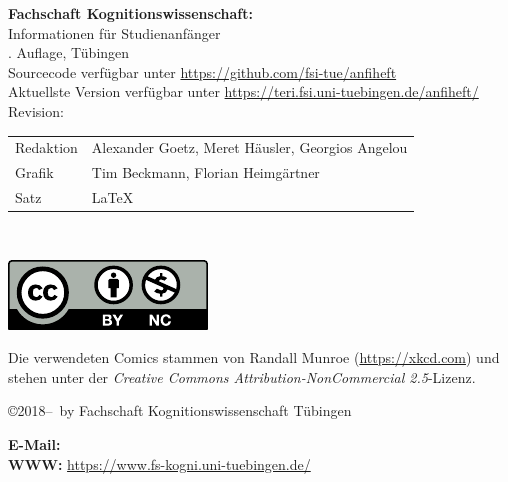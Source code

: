 \thispagestyle{empty}

\textbf{Fachschaft Kognitionswissenschaft:}\\
Informationen für Studienanfänger\\
\number\auflage. Auf\/lage, Tübingen \number\jahr\\[0.2cm]
{\footnotesize Sourcecode verfügbar unter \url{https://github.com/fsi-tue/anfiheft}\\
               Aktuellste Version verfügbar unter \url{https://teri.fsi.uni-tuebingen.de/anfiheft/}\\
	       Revision: \gitCommit\\[1cm]}


\begin{tabular}{ll}
	Redaktion & Alexander Goetz, Meret Häusler, Georgios Angelou\\ %
	Grafik & Tim Beckmann, Florian Heimgärtner \\
	Satz & \LaTeX
\end{tabular}\\

\vfill
\begin{minipage}[c]{0.1\textwidth}
	\includegraphics[width=\linewidth]{kogni/logos/by-nc.pdf}
\end{minipage}
\begin{minipage}[c]{0.9\textwidth}
	Die verwendeten Comics stammen von Randall Munroe (\url{https://xkcd.com}) und stehen unter der \emph{Creative Commons Attribution-NonCommercial 2.5}-Lizenz.
\end{minipage}

\copyright 2018--\number\jahr~by Fachschaft Kognitionswissenschaft Tübingen\\

\medskip

\textbf{E-Mail:} \hfill
{}\\
\textbf{WWW:} \hfill
\url{https://www.fs-kogni.uni-tuebingen.de/}
\newpage
